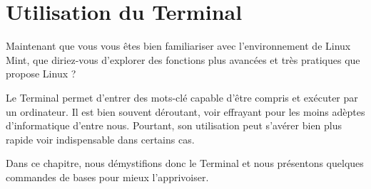 \documentclass[12pt]{book}
\begin{document}
\chapter{Utilisation du Terminal}\label{sec:terminal}%
Maintenant que vous vous êtes bien familiariser avec l'environnement de Linux Mint, que diriez-vous d'explorer des fonctions plus avancées et très pratiques que propose Linux ?\par
Le Terminal permet d'entrer des mots-clé capable d'être compris et exécuter par un ordinateur.
Il est bien souvent déroutant, voir effrayant pour les moins adèptes d'informatique d'entre nous.
Pourtant, son utilisation peut s'avérer bien plus rapide voir indispensable dans certains cas.\par
Dans ce chapitre, nous démystifions donc le Terminal et nous présentons quelques commandes de bases pour mieux l'apprivoiser.
\end{document}
